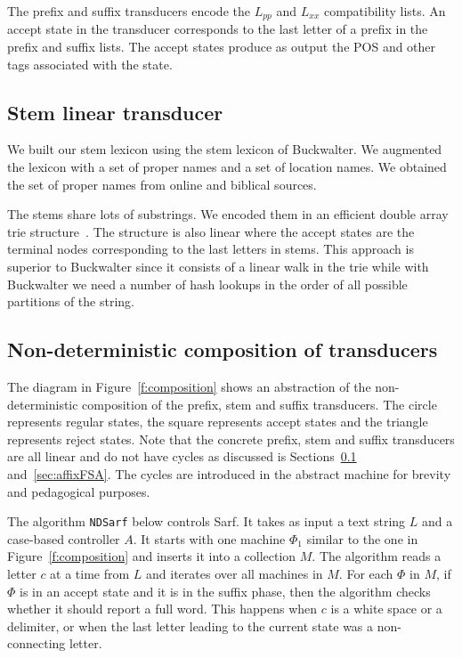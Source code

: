 \documentclass[11pt,letterpaper]{article}
\newcommand{\CodeIn}[1]{{\small\texttt{#1}}}
\begin{document}
The prefix and suffix transducers encode the $L_{pp}$ and
$L_{xx}$ compatibility lists.
An accept state in the transducer corresponds to the last letter 
of a prefix in the prefix and suffix lists.
The accept states produce as output the POS and other tags
associated with the state.

\subsection{Stem linear transducer}
\label{sec:stemFSA}

We built our stem lexicon using the stem lexicon of 
Buckwalter. 
We augmented the lexicon with a set of proper names and
a set of location names. 
We obtained the set of proper names from online 
and biblical sources. 

The stems share lots of substrings. We encoded them in
an efficient double array trie structure~\cite{Aoe:89}. 
The structure is also linear where the accept
states are the terminal nodes corresponding to the last 
letters in stems. 
This approach is superior to Buckwalter since it consists of
a linear walk in the trie while with Buckwalter we need
a number of hash lookups in the order of all possible partitions
of the string.

\subsection{Non-deterministic composition of transducers}
\label{sec:ndfsa}

The diagram in Figure~\ref{f:composition} shows an 
abstraction of the non-deterministic composition 
of the prefix, stem and suffix transducers. 
The circle represents regular states, the square
represents accept states and the triangle represents
reject states. 
Note that the concrete prefix, stem and suffix transducers
are all linear and do not have cycles as discussed 
is Sections~\ref{sec:stemFSA} and~\ref{sec:affixFSA}.
The cycles are introduced in the abstract machine
for brevity and pedagogical purposes.

\begin{figure*}[tb]
\end{figure*}

The algorithm \CodeIn{NDSarf} below controls Sarf. 
It takes as input a text string $L$ and a case-based controller
$A$. 
It starts with one machine $\Phi_1$ similar to the one in 
Figure~\ref{f:composition} and inserts it into a collection
$M$. 
The algorithm reads a letter $c$ at a time from $L$
and iterates over all machines in $M$. 
For each $\Phi$ in $M$,
if $\Phi$ is in an accept state and it is in the suffix
phase, then the algorithm checks whether it should report
a full word. 
This happens when $c$ is a white space or a delimiter, 
or when the last letter leading to the current state
was a non-connecting letter. 
\end{document}
